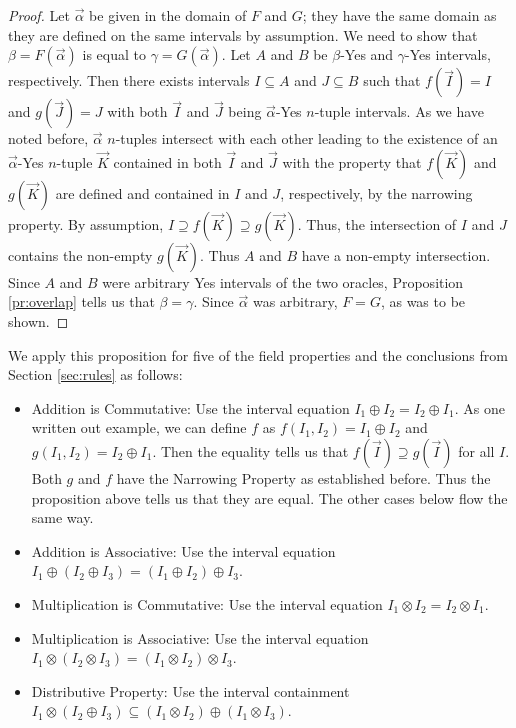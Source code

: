 \documentclass[12pt]{article}
\begin{document}
\begin{proof}
Let $\vec{\alpha}$ be given in the domain of $F$ and $G$; they have the same domain as they are defined on the same intervals by assumption. We need to show that $\beta = F(\vec{\alpha})$ is equal to $\gamma =  G(\vec{\alpha})$. Let $A$ and $B$ be $\beta$-Yes and $\gamma$-Yes intervals, respectively. Then there exists intervals $I \subseteq A$ and  $J \subseteq B$  such that $f(\vec{I}) = I$ and $g(\vec{J}) = J$ with both  $\vec{I}$ and $\vec{J}$ being $\vec{\alpha}$-Yes $n$-tuple intervals. As we have noted before, $\vec{\alpha}$ $n$-tuples intersect with each other leading to the existence of an $\vec{\alpha}$-Yes $n$-tuple $\vec{K}$ contained in both $\vec{I}$ and $\vec{J}$ with the property that $f(\vec{K})$ and $g(\vec{K})$ are defined and contained in $I$ and $J$, respectively, by the narrowing property. By assumption, $I \supseteq f(\vec{K}) \supseteq g(\vec{K})$. Thus, the intersection of $I$ and $J$ contains the non-empty $g(\vec{K})$. Thus $A$ and $B$ have a non-empty intersection. Since $A$ and $B$ were arbitrary Yes intervals of the two oracles, Proposition \ref{pr:overlap} tells us that $\beta = \gamma$. Since $\vec{\alpha}$ was arbitrary, $F = G$, as was to be shown.
\end{proof}

We apply this proposition for five of the field properties and the conclusions from Section \ref{sec:rules} as follows: 

\begin{itemize}
    \item Addition is Commutative:  Use the interval equation $I_1 \oplus I_2 = I_2 \oplus I_1$. As one written out example, we can define $f$ as $f(I_1, I_2) = I_1 \oplus I_2$ and $g(I_1, I_2) = I_2 \oplus I_1$. Then the equality tells us that $f(\vec{I}) \supseteq g(\vec{I})$ for all $I$. Both $g$ and $f$ have the Narrowing Property as established before. Thus the proposition above tells us that they are equal. The other cases below flow the same way. 
    \item Addition is Associative: Use the interval equation $I_1 \oplus (I_2 \oplus I_3) = (I_1 \oplus I_2) \oplus I_3$.
    \item Multiplication is Commutative: Use the interval equation $I_1 \otimes I_2 = I_2 \otimes I_1$.
    \item Multiplication is Associative: Use the interval equation $I_1 \otimes (I_2 \otimes I_3) = (I_1 \otimes I_2) \otimes I_3$.
    \item Distributive Property: Use the interval containment $I_1 \otimes (I_2 \oplus I_3) \subseteq (I_1 \otimes I_2) \oplus (I_1 \otimes I_3)$.
\end{itemize}
\end{document}
